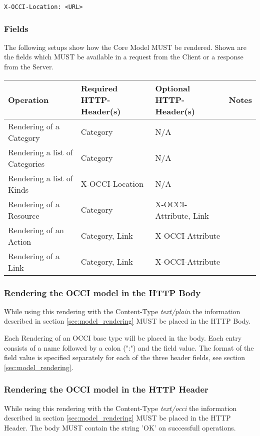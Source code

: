\documentclass[10pt,a4paper]{article}
\begin{document}
\begin{verbatim}
X-OCCI-Location: <URL>
\end{verbatim}

\subsubsection{Fields}
The following setups show how the Core Model MUST be rendered. Shown
are the fields which MUST be available in a request from the Client or
a response from the Server.

\begin{tabular}{l|l|l|l}
Operation & Required HTTP-Header(s) & Optional HTTP-Header(s) & Notes \\
\hline
Rendering of a Category & Category & N/A & \\
Rendering a list of Categories & Category & N/A & \\
Rendering a list of Kinds & X-OCCI-Location & N/A & \\
Rendering of a Resource & Category & X-OCCI-Attribute, Link & \\
Rendering of an Action & Category, Link & X-OCCI-Attribute & \\
Rendering of a Link & Category, Link & X-OCCI-Attribute & \\
\end{tabular}

\subsubsection{Rendering the OCCI model in the HTTP Body}
\label{sec:http_body}
While using this rendering with the Content-Type \textit{text/plain}
the information described in section \ref{sec:model_rendering} MUST be
placed in the HTTP Body.

Each Rendering of an OCCI base type will be placed in the body. Each
entry consists of a name followed by a colon (":") and the field
value. The format of the field value is specified separately for each
of the three header fields, see section \ref{sec:model_rendering}.

\subsubsection{Rendering the OCCI model in the HTTP Header}
While using this rendering with the Content-Type \textit{text/occi}
the information described in section \ref{sec:model_rendering} MUST be
placed in the HTTP Header. The body MUST contain the string 'OK' on
successfull operations.
\end{document}
